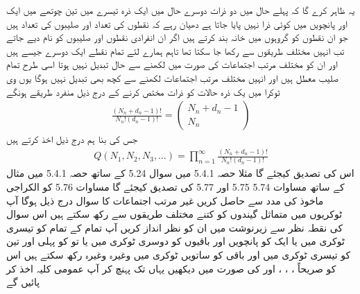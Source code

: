یہ ظاہر کرے گا کہ پہلے حال میں دو ذرات دوسرے حال میں ایک ذرہ تیسرے میں تین چوتھے میں ایک اور پانچویں میں کوئی ذرا نہیں پایا جاتا ہے دھیان رہے کہ نقطوں کی تعداد  اور صلیبوں کی تعداد  ہیں جو ان نقطوں کو  گروہوں میں خانہ بند کرتے ہیں اگر ان انفرادی نقطوں اور صلیبوں کو نام دیے جاتے تب انہیں  مختلف طریقوں سے رکھا جا سکتا تھا تاہم ہمارے لئے تمام نقطے ایک دوسرے  جیسے ہیں اور ان کو  مختلف مرتب اجتماعات کی صورت میں لکھنے سے حال تبدیل نہیں ہوتا اسی طرح تمام صلیب معطل ہیں اور انہیں  مختلف مرتب اجتماعات لکھنے سے کچھ بھی تبدیل نہیں ہوگا یوں  وی ٹوکرا میں  یک ذرہ حالات کو  ذرات مختص کرنے کے درج ذیل منفرد طریقے ہونگے 
\begin{align}
\frac{(N_n + d_n - 1) !}{N_n ! (d_n - 1) !} = 
\begin{pmatrix}
N_n + d_n - 1 \\
N_n
\end{pmatrix}
\end{align}
جس کی بنا ہم درج ذیل اخذ کرتے ہیں 
\begin{align}
Q(N_1 , N_2 , N_3 , \dotsc) = \prod_{n = 1}^{\infty} \frac{(N_n + d_n - 1) !}{N_n ! (d_n - 1) !}
\end{align}
اس کی تصدیق کیجئے گا مثلا حصہ 5.4.1 میں سوال 5.24 کے ساتھ 
حصہ 5.4.1 میں مثال کے ساتھ مساوات 5.74 5.75 اور 5.77 کی تصدیق کیجئے گا 
مساوات 5.76 کو الكراجى ماخوذ کی مدد سے حاصل کریں غیر مرتب اجتماعات کا سوال درج ذیل ہوگا آپ  ٹوکریوں میں  متماثل گیندوں کو کتنے مختلف طریقوں سے رکھ سکتے ہیں اس سوال کی نقطہ نظر سے زیرنوشت میں ان کو نظر انداز کریں آپ تمام کے تمام  کو تیسری ٹوکری میں یا ایک کو پانچویں اور باقیوں کو دوسری ٹوکری میں یا تو کو پہلی اور تین کو تیسری ٹوکری میں اور باقی کو ساتویں ٹوکری میں وغیرہ وغیرہ رکھ سکتے ہیں اس کو صریحاً ،  ،  ،  اور  کی صورت میں دیکھیں یہاں تک پہنچ کر آپ عمومی کلیہ اخذ کر پائیں گے 

